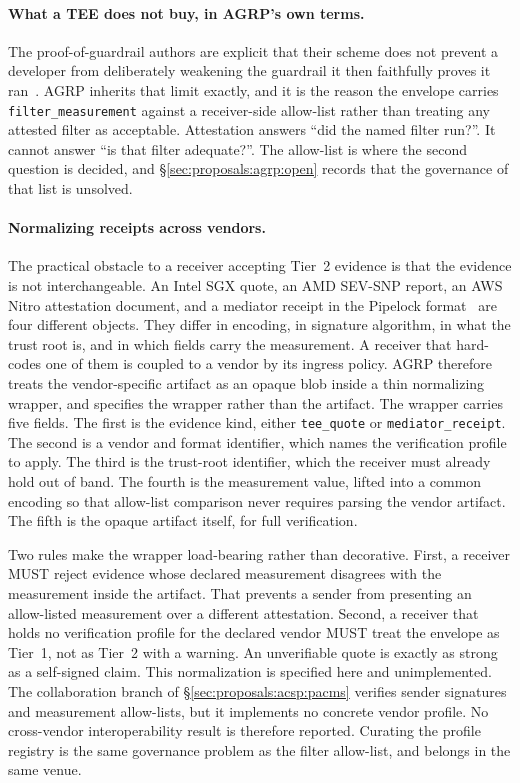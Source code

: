 \paragraph{What a TEE does not buy, in AGRP's own terms.}
The proof-of-guardrail authors are explicit that their
scheme does not prevent a developer from deliberately
weakening the guardrail it then faithfully proves it
ran~\cite{proof_of_guardrail}. AGRP inherits that limit
exactly, and it is the reason the envelope carries
\texttt{filter\_measurement} against a receiver-side
allow-list rather than treating any attested filter as
acceptable. Attestation answers ``did the named filter
run?''. It cannot answer ``is that filter adequate?''. The
allow-list is where the second question is decided, and
\S\ref{sec:proposals:agrp:open} records that the governance
of that list is unsolved.

\paragraph{Normalizing receipts across vendors.}
The practical obstacle to a receiver accepting Tier~2
evidence is that the evidence is not interchangeable. An
Intel SGX quote, an AMD SEV-SNP report, an AWS Nitro
attestation document, and a mediator receipt in the Pipelock
format~\cite{pipelock} are four different objects. They
differ in encoding, in signature
algorithm, in what the trust root is, and in which fields
carry the measurement. A receiver that hard-codes one of
them is coupled to a vendor by its ingress policy. AGRP
therefore treats the vendor-specific artifact as an opaque
blob inside a thin normalizing wrapper, and specifies the
wrapper rather than the artifact. The wrapper carries five
fields. The first is the evidence kind, either
\texttt{tee\_quote} or \texttt{mediator\_receipt}. The second
is a vendor and format identifier, which names the
verification profile to apply. The third is the trust-root
identifier, which the receiver must already hold out of band.
The fourth is the measurement value, lifted into a common
encoding so that allow-list comparison never requires parsing
the vendor artifact. The fifth is the opaque artifact itself,
for full verification.

Two rules make the wrapper load-bearing rather than
decorative. First, a receiver MUST reject evidence whose
declared measurement disagrees with the measurement inside
the artifact. That prevents a sender from presenting an
allow-listed measurement over a different attestation.
Second, a receiver that holds no verification profile for the
declared vendor MUST treat the envelope as Tier~1, not as
Tier~2 with a warning. An unverifiable quote is exactly as
strong as a self-signed claim. This normalization is
specified here and unimplemented. The collaboration branch
of \S\ref{sec:proposals:acsp:pacms} verifies sender
signatures and measurement allow-lists, but it implements no
concrete vendor profile. No cross-vendor
interoperability result is therefore reported. Curating the profile
registry is the same governance problem as the filter
allow-list, and belongs in the same venue.

